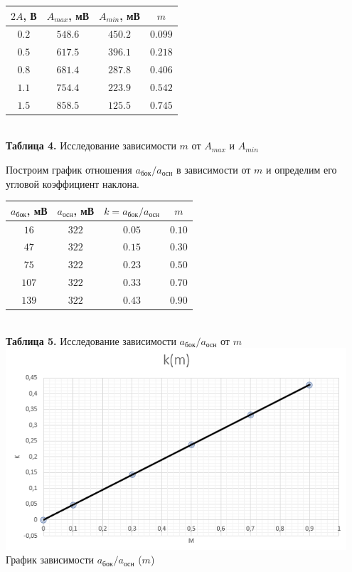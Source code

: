 \documentclass[a4paper,12pt]{article} %
\begin{document}
\begin{center}
\begin{tabular}{|c|c|c|c|}\hline
$2A$, В&$A_{max}$, мВ&$A_{min}$, мВ&$m$\\\hline
$0.2$&$548.6$&$450.2$&$0.099$\\\hline
$0.5$&$617.5$&$396.1$&$0.218$\\\hline
$0.8$&$681.4$&$287.8$&$0.406$\\\hline
$1.1$&$754.4$&$223.9$&$0.542$\\\hline
$1.5$&$858.5$&$125.5$&$0.745$\\\hline
\end{tabular}\\
\hfill \break \textbf {Таблица 4.} Исследование зависимости $m$ от $A_{max}$ и $A_{min}$\\
\end{center}

\hfill \break Построим график отношения $a_\text{бок}/a_\text{осн}$ в зависимости от $m$ и определим его угловой коэффициент наклона.

\begin{center}
\begin{tabular}{|c|c|c|c|}\hline
$a_\text{бок}$, мВ&$a_\text{осн}$, мВ&$k = a_\text{бок}/a_\text{осн}$&$m$\\\hline
$16$&$322$&$0.05$&$0.10$\\\hline
$47$&$322$&$0.15$&$0.30$\\\hline
$75$&$322$&$0.23$&$0.50$\\\hline
$107$&$322$&$0.33$&$0.70$\\\hline
$139$&$322$&$0.43$&$0.90$\\\hline
\end{tabular}\\
\hfill \break \textbf {Таблица 5.} Исследование зависимости $a_\text{бок}/a_\text{осн}$ от $m$\\
\includegraphics[width=0.95\textwidth]{21.png}\\
График зависимости $a_\text{бок}/a_\text{осн}$ ($m$)~\\
\end{center}
\end{document}
